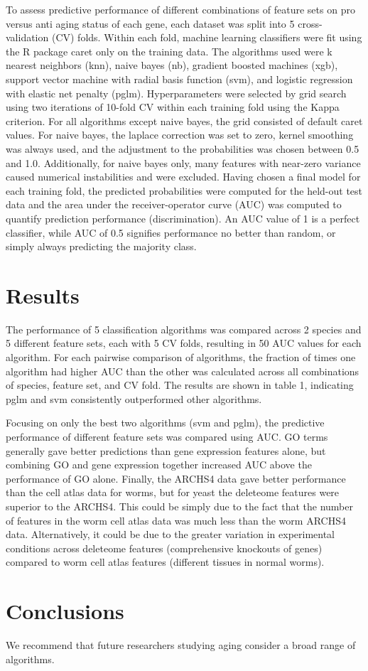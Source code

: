 \documentclass{article}
\begin{document}
To assess predictive performance of different combinations of feature sets on pro versus anti aging status of each gene, each dataset was split into 5 cross-validation (CV) folds. Within each fold, machine learning classifiers were fit using the R package caret only on the training data. The algorithms used were k nearest neighbors (knn), naive bayes (nb), gradient boosted machines (xgb), support vector machine with radial basis function (svm), and logistic regression with elastic net penalty (pglm). Hyperparameters were selected by grid search using two iterations of 10-fold CV within each training fold using the Kappa criterion. For all algorithms except naive bayes, the grid consisted of default caret values. For naive bayes, the laplace correction was set to zero, kernel smoothing was always used, and the adjustment to the probabilities was chosen between 0.5 and 1.0. Additionally, for naive bayes only, many features with near-zero variance caused numerical instabilities and were excluded. Having chosen a final model for each training fold, the predicted probabilities were computed for the held-out test data and the area under the receiver-operator curve (AUC) was computed to quantify prediction performance (discrimination). An AUC value of 1 is a perfect classifier, while AUC of 0.5 signifies performance no better than random, or simply always predicting the majority class.

\section{Results}

The performance of 5 classification algorithms was compared across 2 species and 5 different feature sets, each with 5 CV folds, resulting in 50 AUC values for each algorithm. For each pairwise comparison of algorithms, the fraction of times one algorithm had higher AUC than the other was calculated across all combinations of species, feature set, and CV fold. The results are shown in table 1, indicating pglm and svm consistently outperformed other algorithms.

Focusing on only the best two algorithms (svm and pglm), the predictive performance of different feature sets was compared using AUC. GO terms generally gave better predictions than gene expression features alone, but combining GO and gene expression together increased AUC above the performance of GO alone. Finally, the ARCHS4 data gave better performance than the cell atlas data for worms, but for yeast the deleteome features were superior to the ARCHS4. This could be simply due to the fact that the number of features in the worm cell atlas data was much less than the worm ARCHS4 data. Alternatively, it could be due to the greater variation in experimental conditions across deleteome features (comprehensive knockouts of genes) compared to worm cell atlas features (different tissues in normal worms).

\section{Conclusions}

We recommend that future researchers studying aging consider a broad range of algorithms.



\end{document}
